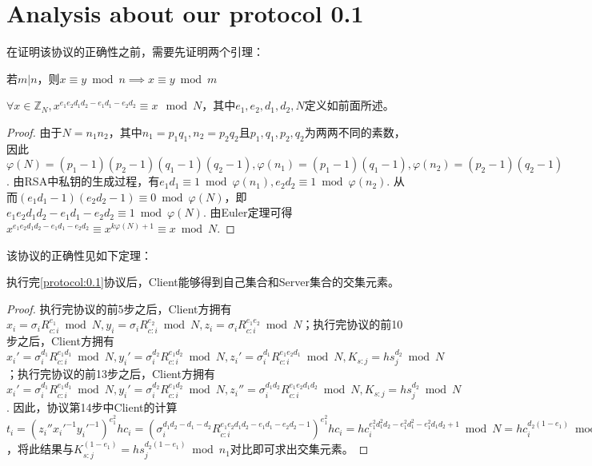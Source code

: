 \section{Analysis about our protocol 0.1}
在证明该协议的正确性之前，需要先证明两个引理：
\begin{lemma}\label{lem:mod}
若$m|n$，则$x\equiv y\bmod{n}\implies x\equiv y\bmod{m}$
\end{lemma}
\begin{lemma}\label{lem:euler}
$\forall x\in \mathbb{Z}_N,x^{e_1e_2d_1d_2-e_1d_1-e_2d_2}\equiv x\mod{N}$，其中$e_1,e_2,d_1,d_2,N$定义如前面所述。
\end{lemma}
\begin{proof}
由于$N=n_1n_2$，其中$n_1=p_1q_1,n_2=p_2q_2$且$p_1,q_1,p_2,q_2$为两两不同的素数，因此$\varphi(N)=(p_1-1)(p_2-1)(q_1-1)(q_2-1),\varphi(n_1)=(p_1-1)(q_1-1),\varphi(n_2)=(p_2-1)(q_2-1)$. 由RSA中私钥的生成过程，有$e_1d_1\equiv 1\bmod{\varphi(n_1)},e_2d_2\equiv 1\bmod{\varphi(n_2)}$. 从而$(e_1d_1-1)(e_2d_2-1)\equiv 0\bmod{\varphi(N)}$，即$e_1e_2d_1d_2-e_1d_1-e_2d_2\equiv 1\bmod{\varphi(N)}$. 由Euler定理可得$x^{e_1e_2d_1d_2-e_1d_1-e_2d_2}\equiv x^{k\varphi(N)+1}\equiv x\bmod{N}$.
\end{proof}

该协议的正确性见如下定理：
\begin{theorem}\label{thm:Protocol0.1}
执行完\ref{protocol:0.1}协议后，Client能够得到自己集合和Server集合的交集元素。
\end{theorem}
\begin{proof}
执行完协议的前5步之后，Client方拥有$x_i=\sigma_i R_{c:i}^{e_1}\bmod{N}, y_i=\sigma_iR_{c:i}^{e_2}\bmod{N}, z_i=\sigma_iR_{c:i}^{e_1e_2}\bmod{N}$；执行完协议的前10步之后，Client方拥有$x_i'=\sigma_i^{d_1} R_{c:i}^{e_1d_1}\bmod{N},y_i'=\sigma_i^{d_2} R_{c:i}^{e_1d_2}\bmod{N}, z_i'=\sigma_i^{d_1}R_{c:i}^{e_1e_2d_1}\bmod{N}, K_{s:j}=hs_j^{d_2}\bmod{N}$；执行完协议的前13步之后，Client方拥有$x_i'=\sigma_i^{d_1} R_{c:i}^{e_1d_1}\bmod{N},y_i'=\sigma_i^{d_2} R_{c:i}^{e_1d_2}\bmod{N},z_i''=\sigma_i^{d_1d_2}R_{c:i}^{e_1e_2d_1d_2}\bmod{N}, K_{s:j}=hs_j^{d_2}\bmod{N}$. 因此，协议第14步中Client的计算$t_i=(z_i''x_i'^{-1}y_i'^{-1})^{e_1^2}hc_i=(\sigma_i^{d_1d_2-d_1-d_2}R_{c:i}^{e_1e_2d_1d_2-e_1d_1-e_2d_2-1})^{e_1^2}hc_i=hc_i^{e_1^2d_1^2d_2-e_1^2d_1^2-e_1^2d_1d_2+1}\bmod{N}=hc_i^{d_2(1-e_1)}\bmod{n_1}$，将此结果与$K_{s:j}^{(1-e_1)}=hs_j^{d_2(1-e_1)}\bmod{n_1}$对比即可求出交集元素。
\end{proof}

